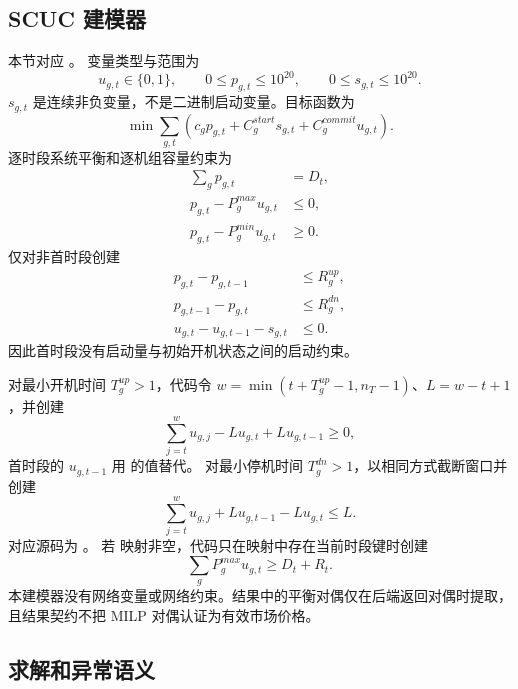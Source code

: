 \subsection{SCUC 建模器}

本节对应 。
变量类型与范围为
\begin{equation}
 u_{g,t}\in\{0,1\},\qquad
 0\le p_{g,t}\le10^{20},\qquad
 0\le s_{g,t}\le10^{20}.
\end{equation}
$s_{g,t}$ 是连续非负变量，不是二进制启动变量。目标函数为
\begin{equation}
 \min\sum_{g,t}\left(c_gp_{g,t}+C_g^{start}s_{g,t}+C_g^{commit}u_{g,t}\right).
\end{equation}
逐时段系统平衡和逐机组容量约束为
\begin{align}
 \sum_g p_{g,t}&=D_t,\\
 p_{g,t}-P_g^{max}u_{g,t}&\le0,\\
 p_{g,t}-P_g^{min}u_{g,t}&\ge0.
\end{align}
仅对非首时段创建
\begin{align}
 p_{g,t}-p_{g,t-1}&\le R_g^{up},\\
 p_{g,t-1}-p_{g,t}&\le R_g^{dn},\\
 u_{g,t}-u_{g,t-1}-s_{g,t}&\le0.
\end{align}
因此首时段没有启动量与初始开机状态之间的启动约束。

对最小开机时间 $T_g^{up}>1$，代码令
$w=\min(t+T_g^{up}-1,n_T-1)$、$L=w-t+1$，并创建
\begin{equation}
 \sum_{j=t}^{w}u_{g,j}-L u_{g,t}+L u_{g,t-1}\ge0,
\end{equation}
首时段的 $u_{g,t-1}$ 用  的值替代。
对最小停机时间 $T_g^{dn}>1$，以相同方式截断窗口并创建
\begin{equation}
 \sum_{j=t}^{w}u_{g,j}+L u_{g,t-1}-L u_{g,t}\le L.
\end{equation}
对应源码为 。
若  映射非空，代码只在映射中存在当前时段键时创建
\begin{equation}
 \sum_g P_g^{max}u_{g,t}\ge D_t+R_t.
\end{equation}
本建模器没有网络变量或网络约束。结果中的平衡对偶仅在后端返回对偶时提取，
且结果契约不把 MILP 对偶认证为有效市场价格。

\subsection{求解和异常语义}

